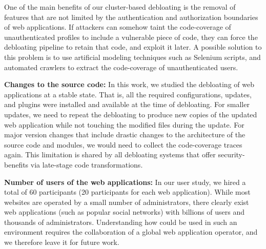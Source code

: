 One of the main benefits of our cluster-based debloating is the removal of features that are not limited by the authentication and authorization boundaries of web applications. 
If attackers can somehow taint the code-coverage of unauthenticated profiles to include a vulnerable piece of code, they can force the debloating pipeline to retain that code, and exploit it later. 
A possible solution to this problem is to use artificial modeling techniques such as Selenium scripts, and automated crawlers to extract the code-coverage of unauthenticated users. 

\noindent\textbf{Changes to the source code:} 
In this work, we studied the debloating of web applications at a stable state. 
That is, all the required configurations, updates, and plugins were installed and available at the time of debloating. 
For smaller updates, we need to repeat the debloating to produce new copies of the updated web application while not touching the modified files during the update. 
For major version changes that include drastic changes to the architecture of the source code and modules, we would need to collect the code-coverage traces again. This limitation is shared by all debloating systems that offer security-benefits via late-stage code transformations.

\noindent\textbf{Number of users of the web applications:} 
In our user study, we hired a total of 60 participants (20 participants for each web application). 
While most websites are operated by a small number of administrators, there clearly exist web applications (such as popular social networks) with billions of users and thousands of administrators. 
Understanding how \sys{} could be used in such an environment requires the collaboration of a global web application operator, and we therefore leave it for future work.